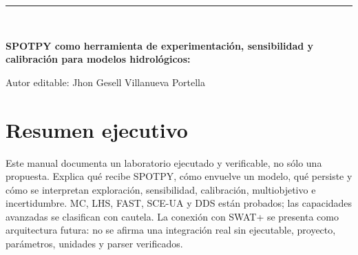 \documentclass[11pt,a4paper]{report}
\begin{document}
\begin{titlepage}
\centering
\vspace*{1.7cm}
{\color{igpblue}\rule{\textwidth}{2pt}}\\[1.2cm]
{\Huge\bfseries SPOTPY como herramienta de experimentación, sensibilidad y calibración para modelos hidrológicos:\par}
\vspace{0.5cm}{\LARGE laboratorio reproducible orientado a SWAT+ IGP\par}
\vspace{1.2cm}{\Large Proyecto PP00089 - Instituto Geofísico del Perú\par}
\vfill
{\large Autor editable: Jhon Gesell Villanueva Portella\par}
\vspace{0.3cm}{\large Versión del laboratorio: SPOTPY 1.6.7\par}
\vspace{0.3cm}{\large \today\par}
\vspace{1.2cm}{\color{igpgreen}\rule{\textwidth}{2pt}}
\end{titlepage}
\chapter*{Resumen ejecutivo}
Este manual documenta un laboratorio ejecutado y verificable, no sólo una propuesta. Explica qué recibe SPOTPY, cómo envuelve un modelo, qué persiste y cómo se interpretan exploración, sensibilidad, calibración, multiobjetivo e incertidumbre. MC, LHS, FAST, SCE-UA y DDS están probados; las capacidades avanzadas se clasifican con cautela. La conexión con SWAT+ se presenta como arquitectura futura: no se afirma una integración real sin ejecutable, proyecto, parámetros, unidades y parser verificados.
\tableofcontents
\listoffigures
\listoftables
















\end{document}
